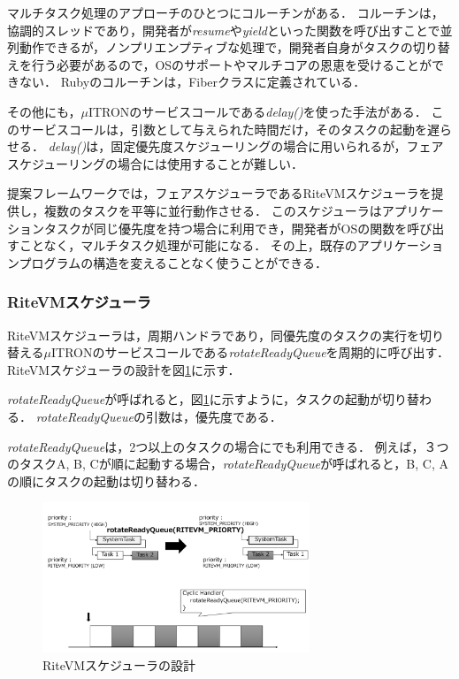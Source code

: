 \documentclass[submit,techrep]{ipsj}
\begin{document}
マルチタスク処理のアプローチのひとつにコルーチンがある．
コルーチンは，協調的スレッドであり，開発者が{\it resume}や{\it yield}といった関数を呼び出すことで並列動作できるが，ノンプリエンプティブな処理で，開発者自身がタスクの切り替えを行う必要があるので，OSのサポートやマルチコアの恩恵を受けることができない．
Rubyのコルーチンは，Fiberクラス\cite{url:co-routine}に定義されている．

その他にも，$\mu$ITRONのサービスコールである{\it delay()}を使った手法がある．
このサービスコールは，引数として与えられた時間だけ，そのタスクの起動を遅らせる．
{\it delay()}は，固定優先度スケジューリングの場合に用いられるが，フェアスケジューリングの場合には使用することが難しい．

提案フレームワークでは，フェアスケジューラであるRiteVMスケジューラを提供し，複数のタスクを平等に並行動作させる．
このスケジューラはアプリケーションタスクが同じ優先度を持つ場合に利用でき，開発者がOSの関数を呼び出すことなく，マルチタスク処理が可能になる．
その上，既存のアプリケーションプログラムの構造を変えることなく使うことができる． 

\subsubsection{RiteVMスケジューラ}
RiteVMスケジューラは，周期ハンドラであり，同優先度のタスクの実行を切り替える$\mu$ITRONのサービスコールである{\it rotateReadyQueue}を周期的に呼び出す．
RiteVMスケジューラの設計を図\ref{fig:rotateReadyQueue}に示す．


{\it rotateReadyQueue}が呼ばれると，図\ref{fig:rotateReadyQueue}に示すように，タスクの起動が切り替わる．
{\it rotateReadyQueue}の引数は，優先度である．

{\it rotateReadyQueue}は，2つ以上のタスクの場合にでも利用できる．
例えば，３つのタスクA, B, Cが順に起動する場合，{\it rotateReadyQueue}が呼ばれると，B, C, Aの順にタスクの起動は切り替わる．

\begin{figure}[t]
    \centering
    \includegraphics[width=8cm,clip]{../EMSOFT2016/figure/rotateReadyQueue.pdf}
    \vspace{-2mm}
    \caption{RiteVMスケジューラの設計}
\vspace{-5mm}
    \label{fig:rotateReadyQueue}
\end{figure} 
 
\end{document}
